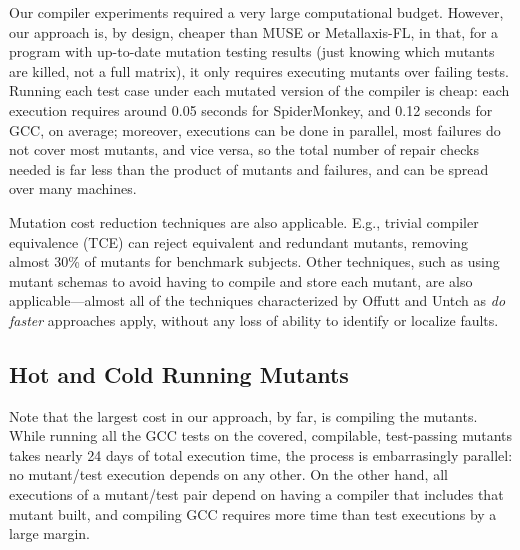 Our compiler experiments required a very large computational budget.  However, our approach is, by design, cheaper than MUSE or Metallaxis-FL, in that, for a program with up-to-date mutation testing results (just knowing which mutants are killed, not a full matrix), it only requires executing mutants over failing tests.  Running each test case under each mutated version of the compiler is cheap: each execution requires around 0.05 seconds for SpiderMonkey, and 0.12 seconds for GCC, on average; moreover, executions can be done in parallel, most failures do not cover most mutants, and vice versa, so the total number of repair checks needed is far less than the product of mutants and failures, and can be spread over many machines.  

Mutation cost reduction techniques are also applicable.  E.g., trivial compiler equivalence (TCE) \cite{TCE} can reject equivalent and redundant mutants, removing almost 30\% of mutants for benchmark subjects. Other techniques, such as using mutant schemas to avoid having to compile and store each mutant, are also applicable---almost all of the techniques characterized by Offutt and Untch \cite{offutt2001mutation} as \emph{do faster} approaches apply, without any loss of ability to identify or localize faults.

\subsection{Hot and Cold Running Mutants}

Note that the largest cost in our approach, by far, is compiling the mutants.  While running all the GCC tests on the covered, compilable, test-passing mutants takes nearly 24 days of total execution time, the process is embarrasingly parallel:  no mutant/test execution depends on any other.  On the other hand, all executions of a mutant/test pair depend on having a compiler that includes that mutant built, and compiling GCC requires more time than test executions by a large margin.

